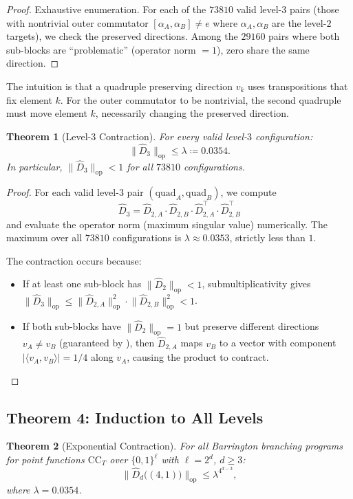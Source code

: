 \documentclass[11pt]{article}
\newtheorem{theorem}{Theorem}[section]
\newcommand{\norm}[1]{\lVert #1 \rVert}
\newcommand{\abs}[1]{\lvert #1 \rvert}
\newcommand{\opn}[1]{\norm{#1}_{\mathrm{op}}}
\newcommand{\Dhat}{\widehat{D}}
\newcommand{\CC}{\mathrm{CC}}
\begin{document}
\begin{proof}
Exhaustive enumeration. For each of the $73810$ valid level-$3$ pairs
(those with nontrivial outer commutator $[\alpha_A, \alpha_B] \neq e$ where
$\alpha_A, \alpha_B$ are the level-$2$ targets), we check the preserved
directions. Among the $29160$ pairs where both sub-blocks are ``problematic''
(operator norm $= 1$), zero share the same direction.
\end{proof}

The intuition is that a quadruple preserving direction $v_k$ uses transpositions
that fix element $k$. For the outer commutator to be nontrivial, the second
quadruple must move element $k$, necessarily changing the preserved direction.

\begin{theorem}[Level-$3$ Contraction]
\label{thm:level23}
For every valid level-$3$ configuration:
\[
\opn{\Dhat_3} \leq \lambda \coloneqq 0.0354.
\]
In particular, $\opn{\Dhat_3} < 1$ for all $73810$ configurations.
\end{theorem}

\begin{proof}
For each valid level-$3$ pair $(\mathrm{quad}_A, \mathrm{quad}_B)$, we compute
\[
\Dhat_3 = \Dhat_{2,A} \cdot \Dhat_{2,B} \cdot \Dhat_{2,A}^\top \cdot \Dhat_{2,B}^\top
\]
and evaluate the operator norm (maximum singular value) numerically. The maximum
over all $73810$ configurations is $\lambda \approx 0.0353$, strictly less than $1$.

The contraction occurs because:
\begin{itemize}[nosep]
\item If at least one sub-block has $\opn{\Dhat_2} < 1$, submultiplicativity gives
  $\opn{\Dhat_3} \leq \opn{\Dhat_{2,A}}^2 \cdot \opn{\Dhat_{2,B}}^2 < 1$.
\item If both sub-blocks have $\opn{\Dhat_2} = 1$ but preserve different directions
  $v_A \neq v_B$ (guaranteed by ), then $\Dhat_{2,A}$ maps $v_B$
  to a vector with component $\abs{\langle v_A, v_B \rangle} = 1/4$ along $v_A$,
  causing the product to contract. \qedhere
\end{itemize}
\end{proof}


\subsection{Theorem 4: Induction to All Levels}

\begin{theorem}[Exponential Contraction]
\label{thm:induction}
For all Barrington branching programs for point functions $\CC_T$ over
$\{0,1\}^\ell$ with $\ell = 2^d$, $d \geq 3$:
\[
\opn{\Dhat_d\bigl((4,1)\bigr)} \leq \lambda^{4^{d-3}},
\]
where $\lambda = 0.0354$.
\end{theorem}
\end{document}
